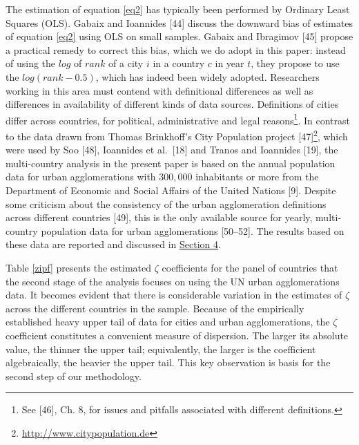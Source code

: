 \documentclass[10pt,letterpaper]{article}
\begin{document}
The estimation of equation \ref{eq2} has typically been performed by
Ordinary Least Squares (OLS). Gabaix and Ioannides {[}44{]} discuss the
downward bias of estimates of equation \ref{eq2} using OLS on small
samples. Gabaix and Ibragimov {[}45{]} propose a practical remedy to
correct this bias, which we do adopt in this paper: instead of using the
\(log\) of \(rank\) of a city \(i\) in a country \(c\) in year \(t\),
they propose to use the \(log(rank-0.5)\), which has indeed been widely
adopted. Researchers working in this area must contend with definitional
differences as well as differences in availability of different kinds of
data sources. Definitions of cities differ across countries, for
political, administrative and legal reasons\footnote{See {[}46{]}, Ch.
  8, for issues and pitfalls associated with different definitions.}. In
contrast to the data drawn from Thomas Brinkhoff's City Population
project {[}47{]}\footnote{\url{http://www.citypopulation.de}}, which
were used by Soo {[}48{]}, Ioannides et al.~{[}18{]} and Tranos and
Ioannides {[}19{]}, the multi-country analysis in the present paper is
based on the annual population data for urban agglomerations with
\(300,000\) inhabitants or more from the Department of Economic and
Social Affairs of the United Nations {[}9{]}. Despite some criticism
about the consistency of the urban agglomeration definitions across
different countries {[}49{]}, this is the only available source for
yearly, multi-country population data for urban agglomerations
{[}50--52{]}. The results based on these data are reported and discussed
in \protect\hyperlink{sec4}{Section 4}.

Table \ref{zipf} presents the estimated \(\zeta\) coefficients for the
panel of countries that the second stage of the analysis focuses on
using the UN urban agglomerations data. It becomes evident that there is
considerable variation in the estimates of \(\zeta\) across the
different countries in the sample. Because of the empirically
established heavy upper tail of data for cities and urban
agglomerations, the \(\zeta\) coefficient constitutes a convenient
measure of dispersion. The larger its absolute value, the thinner the
upper tail; equivalently, the larger is the coefficient algebraically,
the heavier the upper tail. This key observation is basis for the second
step of our methodology.
\end{document}
